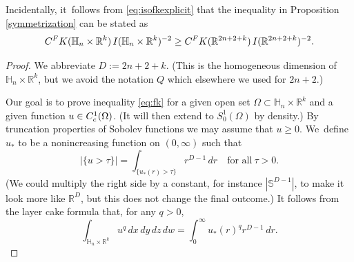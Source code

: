 \documentclass[11pt]{article}
\newcommand{\rc}{\textup{c}}
\newcommand{\FK}{\textup{FK}}
\theoremstyle{definition}
\newcommand{\1}{\mathbbm{1}}
\newcommand{\R}{\mathbb{R}}
\newcommand{\Sph}{\mathbb{S}}
\numberwithin{equation}{section}
\begin{document}
Incidentally, it~follows from \eqref{eq:isofkexplicit} that the inequality in Proposition \ref{symmetrization} can be stated as
\begin{equation}
\label{eq:symmetrization}
C^\FK(\mathbb H_n\times\R^k)\,I(\mathbb H_n\times\R^k)^{-2} \geq
C^\FK(\R^{2n+2+k}) \,I(\mathbb R^{2n+2+k})^{-2}.
\end{equation}

\begin{proof}
We abbreviate $D := 2n+2+k$. (This is the homogeneous dimension of $\mathbb H_n\times\R^k$, but we avoid the notation $Q$ which elsewhere we used for $2n+2$.)

Our goal is to prove inequality \eqref{eq:fk} for a given open set $\Omega\subset\mathbb H_n\times\R^k$ and a given function $u\in C^1_\rc(\Omega)$. (It will then extend to $S^1_0(\Omega)$ by density.) By truncation properties of Sobolev functions we may assume that $u\geq 0$. We~define $u_*$ to be a nonincreasing function on $(0,\infty)$ such that
\[
|\{ u >\tau \}| = \int_{\{u_*(r)>\tau\}} r^{D-1}\,dr
\quad\text{for all}\ \tau>0.
\]
(We could multiply the right side by a constant, for instance $|\Sph^{D-1}|$, to make it look more like $\R^D$, but this does not change the final outcome.) It follows from the layer cake formula that, for any $q>0$,
\begin{equation}
\label{eq:layercake}
\int_{\mathbb H_n\times\R^k} u^q\,dx\,dy\,dz\,dw = \int_0^\infty u_*(r)^q r^{D-1}\,dr.
\end{equation}


\end{proof}
\end{document}
